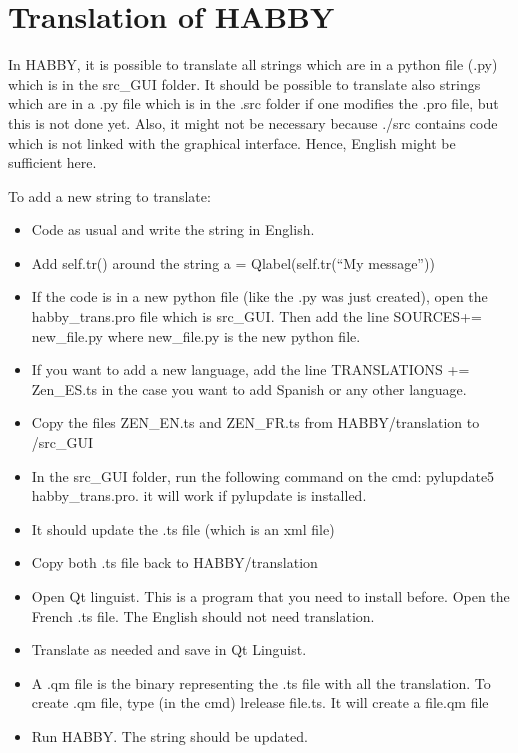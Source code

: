 \documentclass[letterpaper,10pt,english]{sphinxmanual}
\begin{document}
\section{Translation of HABBY}
\label{\detokenize{index:translation-of-habby}}
In HABBY, it is possible to translate all strings which are in a python file (.py)
which is in the src\_GUI folder. It should be possible to translate also strings which
are in a .py file which is in the .src folder if one modifies the .pro file,
but this is not done yet. Also, it might not be necessary because ./src contains
code which is not linked with the graphical interface. Hence, English might be sufficient here.

To add a new string to translate:
\begin{itemize}
\item {} 
Code as usual and write the string in English.

\item {} 
Add self.tr() around the string  a = Qlabel(self.tr(“My message”))

\item {} 
If the code is in a new python file (like the .py was just created), open the habby\_trans.pro file which is src\_GUI. Then add the line SOURCES+= new\_file.py where new\_file.py is the new python file.

\item {} 
If you want to add a new language, add the line TRANSLATIONS += Zen\_ES.ts in the case you want to add Spanish or any other language.

\item {} 
Copy the files ZEN\_EN.ts and ZEN\_FR.ts from HABBY/translation to /src\_GUI

\item {} 
In the src\_GUI folder, run the following command on the cmd: pylupdate5 habby\_trans.pro. it will work if pylupdate is installed.

\item {} 
It should update the .ts file (which is an xml file)

\item {} 
Copy both .ts file back to HABBY/translation

\item {} 
Open Qt  linguist. This is a program that you need to install before. Open the French .ts file. The English should not need translation.

\item {} 
Translate as needed and save in Qt Linguist.

\item {} 
A .qm file is the binary representing the .ts file with all the translation. To create .qm file, type (in the cmd) lrelease  file.ts. It will create a file.qm file

\item {} 
Run HABBY. The string should be updated.

\end{itemize}
\end{document}
